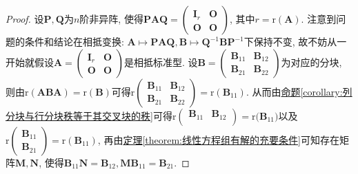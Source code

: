 \documentclass[../../main.tex]{subfiles}
\begin{document}
\begin{proof}
设\(\boldsymbol{P},\boldsymbol{Q}\)为\(n\)阶非异阵, 使得\(\boldsymbol{PAQ}=\begin{pmatrix}\boldsymbol{I}_{r}&\boldsymbol{O}\\\boldsymbol{O}&\boldsymbol{O}\end{pmatrix}\), 其中\(r = \mathrm{r}(\boldsymbol{A})\). 注意到问题的条件和结论在相抵变换: \(\boldsymbol{A}\mapsto\boldsymbol{PAQ},\boldsymbol{B}\mapsto\boldsymbol{Q}^{-1}\boldsymbol{BP}^{-1}\)下保持不变, 故不妨从一开始就假设\(\boldsymbol{A}=\begin{pmatrix}\boldsymbol{I}_{r}&\boldsymbol{O}\\\boldsymbol{O}&\boldsymbol{O}\end{pmatrix}\)是相抵标准型. 设\(\boldsymbol{B}=\begin{pmatrix}\boldsymbol{B}_{11}&\boldsymbol{B}_{12}\\\boldsymbol{B}_{21}&\boldsymbol{B}_{22}\end{pmatrix}\)为对应的分块, 则由\(\mathrm{r}(\boldsymbol{ABA})=\mathrm{r}(\boldsymbol{B})\)可得\(\mathrm{r}\begin{pmatrix}\boldsymbol{B}_{11}&\boldsymbol{B}_{12}\\\boldsymbol{B}_{21}&\boldsymbol{B}_{22}\end{pmatrix}=\mathrm{r}(\boldsymbol{B}_{11})\). 从而由\hyperref[corollary:列分块与行分块秩等于其交叉块的秩]{命题\ref{corollary:列分块与行分块秩等于其交叉块的秩}}可得\(\mathrm{r}\left( \begin{matrix}
\boldsymbol{B}_{11}&		\boldsymbol{B}_{12}\\
\end{matrix} \right) =\mathrm{r(}\boldsymbol{B}_{11})\)以及\(\mathrm{r}\begin{pmatrix}\boldsymbol{B}_{11}\\\boldsymbol{B}_{21}\end{pmatrix}=\mathrm{r}(\boldsymbol{B}_{11})\), 再由\hyperref[theorem:线性方程组有解的充要条件]{定理\ref{theorem:线性方程组有解的充要条件}}可知存在矩阵\(\boldsymbol{M},\boldsymbol{N}\), 使得\(\boldsymbol{B}_{11}\boldsymbol{N}=\boldsymbol{B}_{12},\boldsymbol{M}\boldsymbol{B}_{11}=\boldsymbol{B}_{21}\). 


\end{proof}
\end{document}
